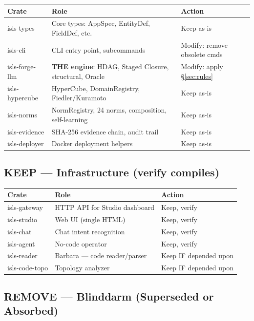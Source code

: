 \documentclass[11pt,a4paper]{article}
\begin{document}
\begin{center}
\small
\begin{tabular}{>{\ttfamily}l l l}
\toprule
\textbf{Crate} & \textbf{Role} & \textbf{Action} \\
\midrule
isls-types & Core types: AppSpec, EntityDef, FieldDef, etc. & Keep as-is \\
isls-cli & CLI entry point, subcommands & Modify: remove obsolete cmds \\
isls-forge-llm & \textbf{THE engine}: HDAG, Staged Closure, structural, Oracle & Modify: apply \S\ref{sec:rules} \\
isls-hypercube & HyperCube, DomainRegistry, Fiedler/Kuramoto & Keep as-is \\
isls-norms & NormRegistry, 24 norms, composition, self-learning & Keep as-is \\
isls-evidence & SHA-256 evidence chain, audit trail & Keep as-is \\
isls-deployer & Docker deployment helpers & Keep as-is \\
\bottomrule
\end{tabular}
\end{center}

\subsection{KEEP --- Infrastructure (verify compiles)}

\begin{center}
\small
\begin{tabular}{>{\ttfamily}l l l}
\toprule
\textbf{Crate} & \textbf{Role} & \textbf{Action} \\
\midrule
isls-gateway & HTTP API for Studio dashboard & Keep, verify \\
isls-studio & Web UI (single HTML) & Keep, verify \\
isls-chat & Chat intent recognition & Keep, verify \\
isls-agent & No-code operator & Keep, verify \\
isls-reader & Barbara --- code reader/parser & Keep IF depended upon \\
isls-code-topo & Topology analyzer & Keep IF depended upon \\
\bottomrule
\end{tabular}
\end{center}

\subsection{REMOVE --- Blinddarm (Superseded or Absorbed)}
\end{document}

